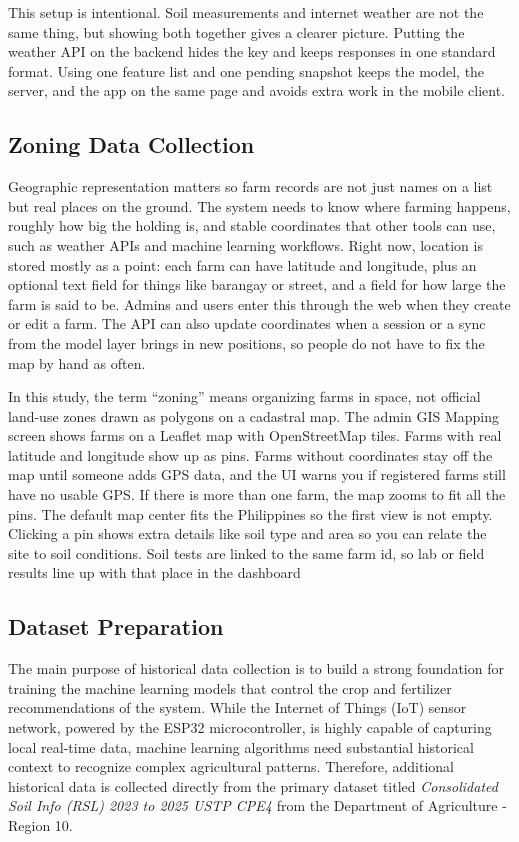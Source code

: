 {	This setup is intentional. Soil measurements and internet weather are not the same thing, but showing both together gives a clearer picture. Putting the weather API on the backend hides the key and keeps responses in one standard format. Using one feature list and one pending snapshot keeps the model, the server, and the app on the same page and avoids extra work in the mobile client.
	
	
	\subsection{Zoning Data Collection}
	Geographic representation matters so farm records are not just names on a list but real places on the ground. The system needs to know where farming happens, roughly how big the holding is, and stable coordinates that other tools can use, such as weather APIs and machine learning workflows. Right now, location is stored mostly as a point: each farm can have latitude and longitude, plus an optional text field for things like barangay or street, and a field for how large the farm is said to be. Admins and users enter this through the web when they create or edit a farm. The API can also update coordinates when a session or a sync from the model layer brings in new positions, so people do not have to fix the map by hand as often.
	
	In this study, the term “zoning” means organizing farms in space, not official land-use zones drawn as polygons on a cadastral map. The admin GIS Mapping screen shows farms on a Leaflet map with OpenStreetMap tiles. Farms with real latitude and longitude show up as pins. Farms without coordinates stay off the map until someone adds GPS data, and the UI warns you if registered farms still have no usable GPS. If there is more than one farm, the map zooms to fit all the pins. The default map center fits the Philippines so the first view is not empty. Clicking a pin shows extra details like soil type and area so you can relate the site to soil conditions. Soil tests are linked to the same farm id, so lab or field results line up with that place in the dashboard
	
	\subsection{Dataset Preparation}
	The main purpose of historical data collection is to build a strong foundation for training the machine learning models that control the crop and fertilizer recommendations of the system. While the Internet of Things (IoT) sensor network, powered by the ESP32 microcontroller, is highly capable of capturing local real-time data, machine learning algorithms need substantial historical context to recognize complex agricultural patterns. Therefore, additional historical data is collected directly from the primary dataset titled \textit{Consolidated Soil Info (RSL) 2023 to 2025 USTP CPE4} from the Department of Agriculture - Region 10.
	
}
